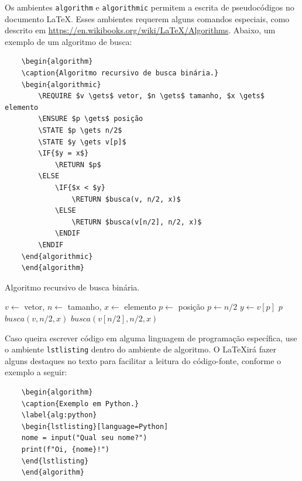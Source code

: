 Os ambientes \verb=algorithm= e \verb=algorithmic= permitem a escrita de pseudocódigos no documento \LaTeX. Esses ambientes requerem alguns comandos especiais, como descrito em \url{https://en.wikibooks.org/wiki/LaTeX/Algorithms}. Abaixo, um exemplo de um algoritmo de busca:

\begin{verbatim}
    \begin{algorithm}
    \caption{Algoritmo recursivo de busca binária.}
    \begin{algorithmic}
        \REQUIRE $v \gets$ vetor, $n \gets$ tamanho, $x \gets$ elemento
        \ENSURE $p \gets$ posição
        \STATE $p \gets n/2$
        \STATE $y \gets v[p]$
        \IF{$y = x$}
            \RETURN $p$
        \ELSE
            \IF{$x < $y}
                \RETURN $busca(v, n/2, x)$
            \ELSE
                \RETURN $busca(v[n/2], n/2, x)$
            \ENDIF
        \ENDIF
    \end{algorithmic}
    \end{algorithm}
\end{verbatim}

\begin{algorithm}
\caption{Algoritmo recursivo de busca binária.}
\begin{algorithmic}
    \REQUIRE $v \gets$ vetor, $n \gets$ tamanho, $x \gets$ elemento
    \ENSURE $p \gets$ posição
    \STATE $p \gets n/2$
    \STATE $y \gets v[p]$
        \RETURN $p$
    \ELSE
            \RETURN $busca(v, n/2, x)$
        \ELSE
            \RETURN $busca(v[n/2], n/2, x)$
        \ENDIF
    \ENDIF
\end{algorithmic}
\end{algorithm}

Caso queira escrever código em alguma linguagem de programação específica, use o ambiente \verb=lstlisting= dentro do ambiente de algoritmo. O \LaTeX\space irá fazer alguns destaques no texto para facilitar a leitura do código-fonte, conforme o exemplo a seguir:

\begin{verbatim}
    \begin{algorithm}
    \caption{Exemplo em Python.}
    \label{alg:python}
    \begin{lstlisting}[language=Python]
    nome = input("Qual seu nome?")
    print(f"Oi, {nome}!")
    \end{lstlisting}
    \end{algorithm}
\end{verbatim}

